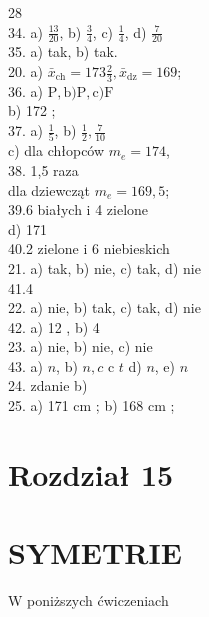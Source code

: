 \documentclass[10pt]{article}
\begin{document}
28\\
34. a) \(\frac{13}{20}\), b) \(\frac{3}{4}\), c) \(\frac{1}{4}\), d) \(\frac{7}{20}\)\\
35. a) tak, b) tak.\\
20. a) \(\bar{x}_{\mathrm{ch}}=173 \frac{2}{3}, \bar{x}_{\mathrm{dz}}=169\);\\
36. a) \(\mathrm{P}, \mathrm{b}) \mathrm{P}, \mathrm{c}) \mathrm{F}\)\\
b) 172 ;\\
37. a) \(\frac{1}{5}\), b) \(\frac{1}{2}, \frac{7}{10}\)\\
c) dla chłopców \(m_{e}=174\),\\
38. 1,5 raza\\
dla dziewcząt \(m_{e}=169,5\);\\
39.6 białych i 4 zielone\\
d) 171\\
40.2 zielone i 6 niebieskich\\
21. a) tak, b) nie, c) tak, d) nie\\
41.4\\
22. a) nie, b) tak, c) tak, d) nie\\
42. a) 12 , b) 4\\
23. a) nie, b) nie, c) nie\\
43. a) \(n\), b) \(n, c\) c \(t\) d) \(n\), e) \(n\)\\
24. zdanie b)\\
25. a) 171 cm ; b) 168 cm ;

\section*{Rozdział 15}
\section*{SYMETRIE}
W poniższych ćwiczeniach
\end{document}
